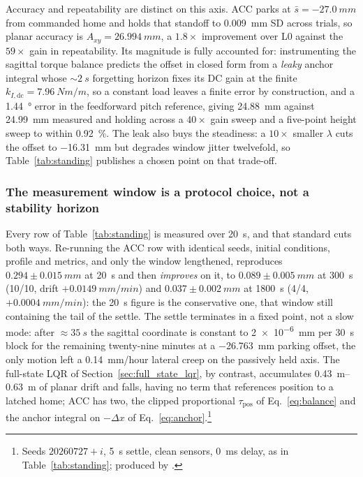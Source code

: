 \documentclass{jcd}
\begin{document}
Accuracy and repeatability are distinct on this axis. ACC parks at
$\bar{s}={-}\SI{27.0}{mm}$ from commanded home and holds that standoff to
\SI{0.009}{mm} SD across trials, so planar accuracy is
$A_{xy}=\SI{26.994}{mm}$, a $1.8{\times}$ improvement over L0 against the
$59{\times}$ gain in repeatability. Its magnitude is fully accounted for:
instrumenting the sagittal torque balance predicts the offset in closed form
from a \emph{leaky} anchor integral whose ${\sim}\SI{2}{s}$ forgetting horizon
fixes its DC gain at the finite $k_{I,\text{dc}}{=}\SI{7.96}{Nm/m}$, so a constant load leaves a finite error by construction, and a \SI{1.44}{\degree} error in the feedforward pitch reference, giving \SI{24.88}{mm} against
\SI{24.99}{mm} measured and holding across a $40{\times}$ gain sweep and a
five-point height sweep to within \SI{0.92}{\percent}. The leak also buys the
steadiness: a $10{\times}$ smaller $\lambda$ cuts the offset to \SI{-16.31}{mm}
but degrades window jitter twelvefold, so Table~\ref{tab:standing} publishes a
chosen point on that trade-off.

\subsubsection{The measurement window is a protocol choice, not a stability
horizon}
\label{sec:longhorizon}

Every row of Table~\ref{tab:standing} is measured over \SI{20}{s}, and that
standard cuts both ways. Re-running the ACC row with identical seeds, initial conditions, profile and metrics, and only the window lengthened, reproduces
$0.294{\pm}\SI{0.015}{mm}$ at \SI{20}{s} and then \emph{improves} on it, to
$0.089{\pm}\SI{0.005}{mm}$ at \SI{300}{s} (10/10, drift $+\SI{0.0149}{mm/min}$)
and $0.037{\pm}\SI{0.002}{mm}$ at \SI{1800}{s} (4/4, $+\SI{0.0004}{mm/min}$): the
\SI{20}{s} figure is the conservative one, that window still containing the tail
of the settle. The settle terminates in a fixed point, not a slow mode: after ${\approx}\SI{35}{s}$ the sagittal coordinate is constant to
\SI{2e-6}{mm} per \SI{30}{s} block for the remaining twenty-nine minutes at a
\SI{-26.763}{mm} parking offset, the only motion left a \SI{0.14}{mm/hour}
lateral creep on the passively held axis. The full-state LQR of
Section~\ref{sec:full_state_lqr}, by contrast, accumulates
\SIrange{0.43}{0.63}{m} of planar drift and falls, having no term that
references position to a latched home; ACC has two, the clipped proportional
$\tau_{\text{pos}}$ of Eq.~\eqref{eq:balance} and the anchor integral on
$-\Delta x$ of Eq.~\eqref{eq:anchor}.\footnote{Seeds
$20260727{+}i$, \SI{5}{s} settle, clean sensors, \SI{0}{ms} delay, as in
Table~\ref{tab:standing}; produced by .}
\end{document}
